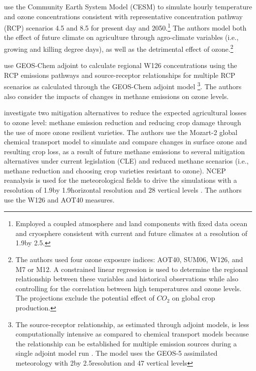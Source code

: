 \documentclass[10pt]{amsart}
\begin{document}
\cite{tai:2014aa} use the Community Earth System Model (CESM) to simulate hourly temperature and ozone concentrations consistent with representative concentration pathway (RCP) scenarios 4.5 and 8.5 for present day and 2050.\footnote{Employed a coupled atmosphere and land components with fixed data ocean and cryosphere consistent with current and future climates at a resolution of 1.9\degree by 2.5\degree.}
The authors model both the effect of future climate on agriculture through agro-climate variables (i.e., growing and killing degree days), as well as the detrimental effect of ozone.\footnote{The authors used four ozone exposure indices: AOT40, SUM06, W126, and M7 or M12. A constrained linear regression is used to determine the regional relationship between these variables and historical observations while also controlling for the correlation between high temperatures and ozone levels. The projections exclude the potential effect of $CO_2$ on global crop production.}  

\cite{lapina:2015aa} use GEOS-Chem adjoint to calculate regional W126 concentrations using the RCP emissions pathways and source-receptor relationships for multiple RCP scenarios as calculated through the GEOS-Chem adjoint model \footnote{The source-receptor relationship, as estimated through adjoint models, is less computationally intensive as compared to chemical transport models because the relationship can be established for multiple emission sources during a single adjoint model run \parencite{lapina:2015aa}. The model uses the GEOS-5 assimilated meteorology with 2\degree by 2.5\degree resolution and 47 vertical levels}.
The authors also consider the impacts of changes in methane emissions on ozone levels.

\cite{avnery:2013ab} investigate two mitigation alternatives to reduce the expected agricultural losses to ozone level: methane emission reduction and reducing crop damage through the use of more ozone resilient varieties.
The authors use the Mozart-2 global chemical transport model to simulate and compare changes in surface ozone and resulting crop loss, as a result of future methane emissions to several mitigation alternatives under current legislation (CLE) and reduced methane scenarios (i.e., methane reduction and choosing crop varieties resistant to ozone). 
NCEP reanalysis is used for the meteorological fields to drive the simulations with a resolution of 1.9\degree by 1.9\degree horizontal resolution and 28 vertical levels \parencite{avnery:2013ab}.
The authors use the W126 and AOT40 measures.
\end{document}
